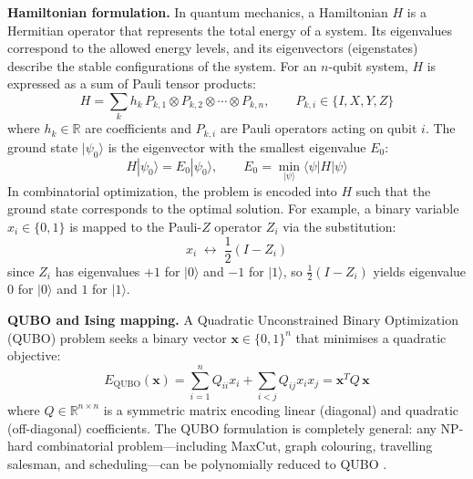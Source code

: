 \textbf{Hamiltonian formulation.} In quantum mechanics, a Hamiltonian $H$ is a Hermitian operator that represents the total energy of a system. Its eigenvalues correspond to the allowed energy levels, and its eigenvectors (eigenstates) describe the stable configurations of the system. For an $n$-qubit system, $H$ is expressed as a sum of Pauli tensor products:
\begin{equation}
    H = \sum_{k} h_k \, P_{k,1} \otimes P_{k,2} \otimes \cdots \otimes P_{k,n}, \qquad P_{k,i} \in \{I, X, Y, Z\}
    \label{eq:hamiltonian_pauli}
\end{equation}
where $h_k \in \mathbb{R}$ are coefficients and $P_{k,i}$ are Pauli operators acting on qubit $i$. The ground state $|\psi_0\rangle$ is the eigenvector with the smallest eigenvalue $E_0$:
\begin{equation}
    H |\psi_0\rangle = E_0 |\psi_0\rangle, \qquad E_0 = \min_{|\psi\rangle} \langle \psi | H | \psi \rangle
    \label{eq:ground_state}
\end{equation}
In combinatorial optimization, the problem is encoded into $H$ such that the ground state corresponds to the optimal solution. For example, a binary variable $x_i \in \{0,1\}$ is mapped to the Pauli-$Z$ operator $Z_i$ via the substitution:
\begin{equation}
    x_i \;\longleftrightarrow\; \frac{1}{2}(I - Z_i)
    \label{eq:z_substitution}
\end{equation}
since $Z_i$ has eigenvalues $+1$ for $|0\rangle$ and $-1$ for $|1\rangle$, so $\frac{1}{2}(I-Z_i)$ yields eigenvalue $0$ for $|0\rangle$ and $1$ for $|1\rangle$.

\textbf{QUBO and Ising mapping.} A Quadratic Unconstrained Binary Optimization (QUBO) problem seeks a binary vector $\mathbf{x} \in \{0,1\}^n$ that minimises a quadratic objective:
\begin{equation}
    E_{\text{QUBO}}(\mathbf{x}) = \sum_{i=1}^{n} Q_{ii} x_i + \sum_{i < j} Q_{ij} x_i x_j = \mathbf{x}^T Q \, \mathbf{x}
    \label{eq:qubo}
\end{equation}
where $Q \in \mathbb{R}^{n \times n}$ is a symmetric matrix encoding linear (diagonal) and quadratic (off-diagonal) coefficients. The QUBO formulation is completely general: any NP-hard combinatorial problem---including MaxCut, graph colouring, travelling salesman, and scheduling---can be polynomially reduced to QUBO \cite{dalyac_qualifying_2021}.

